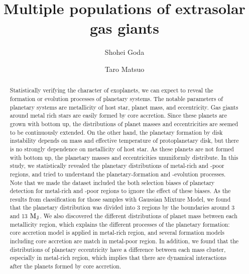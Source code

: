\documentclass[twocolumn, dvipdfmx]{aastex62}
\begin{document}
\begin{CJK*}{UTF8}{min}

\title{Multiple populations of extrasolar gas giants}

\author{Shohei Goda}

\author{Taro Matsuo}


\begin{abstract}

Statistically verifying the character of exoplanets, we can expect to reveal the formation or evolution processes of planetary systems. The notable parameters of planetary systems are metallicity of host star, planet mass, and eccentricity. Gas giants around metal rich stars are easily formed by core accretion. Since these planets are grown with bottom up, the distributions of planet masses and eccentricities are seemed to be continuously extended.
On the other hand, the planetary formation by disk instability depends on mass and effective temperature of protoplanetary disk, but there is no strongly dependence on metallicity of host star. As these planets are not formed with bottom up, the planetary masses and eccentricities ununiformly distribute. In this study, we statistically revealed the planetary distributions of metal-rich and -poor regions, and tried to understand the planetary-formation and -evolution processes. Note that we made the dataset included the both selection biases of planetary detection for metal-rich and -poor regions to ignore the effect of these biases. As the results from classification for those samples with Gaussian Mixture Model, we found that the planetary distribution was divided into 3 regions by the boundaries around 3 and 13 $\rm M_J$. We also discovered the different distributions of planet mass between each metallicity region, which explains the different processes of the planetary formation: core accretion model is applied in metal-rich region, and several formation models including core accretion are match in metal-poor region. In addition, we found that the distributions of planetary eccentricity have a difference between each mass cluster, especially in metal-rich region, which implies that there are dynamical interactions after the planets formed by core accretion.



\end{abstract}
\end{CJK*}
\end{document}
